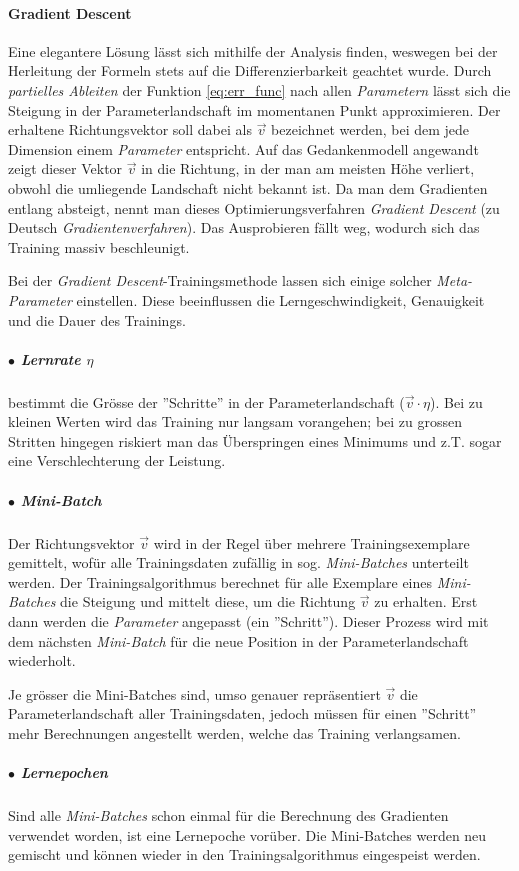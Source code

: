 \paragraph{Gradient Descent}\label{cha:theo:backprop:gd} Eine elegantere Lösung lässt sich mithilfe der Analysis finden, weswegen bei der Herleitung der Formeln stets auf die Differenzierbarkeit geachtet wurde. Durch \textit{partielles Ableiten} der Funktion \ref{eq:err_func} nach allen \textit{Parametern} lässt sich die Steigung in der Parameterlandschaft im momentanen Punkt approximieren. Der erhaltene Richtungsvektor soll dabei als $\vec{v}$ bezeichnet werden, bei dem jede Dimension einem \textit{Parameter} entspricht. Auf das Gedankenmodell angewandt zeigt dieser Vektor $\vec{v}$ in die Richtung, in der man am meisten Höhe verliert, obwohl die umliegende Landschaft nicht bekannt ist. Da man dem Gradienten entlang absteigt, nennt man dieses Optimierungsverfahren \textit{Gradient Descent} (zu Deutsch \textit{Gradientenverfahren}). Das Ausprobieren fällt weg, wodurch sich das Training massiv beschleunigt.

Bei der \textit{Gradient Descent}-Trainingsmethode lassen sich einige solcher \textit{Meta-Parameter} einstellen. Diese beeinflussen die Lerngeschwindigkeit, Genauigkeit und die Dauer des Trainings.

\subparagraph{$\bullet$ Lernrate $\eta$} bestimmt die Grösse der ''Schritte'' in der Parameterlandschaft ($\vec{v} \cdot \eta$). Bei zu kleinen Werten wird das Training nur langsam vorangehen; bei zu grossen Stritten hingegen riskiert man das Überspringen eines Minimums und z.T. sogar eine Verschlechterung der Leistung. 

\subparagraph{$\bullet$ Mini-Batch} Der Richtungsvektor $\vec{v}$ wird in der Regel über mehrere Trainingsexemplare gemittelt, wofür alle Trainingsdaten zufällig in sog. \textit{Mini-Batches} unterteilt werden. Der Trainingsalgorithmus berechnet für alle Exemplare eines \textit{Mini-Batches} die Steigung und mittelt diese, um die Richtung $\vec{v}$ zu erhalten. Erst dann werden die \textit{Parameter} angepasst (ein ''Schritt''). Dieser Prozess wird mit dem nächsten \textit{Mini-Batch} für die neue Position in der Parameterlandschaft wiederholt.

Je grösser die Mini-Batches sind, umso genauer repräsentiert $\vec{v}$ die Parameterlandschaft aller Trainingsdaten, jedoch müssen für einen ''Schritt'' mehr Berechnungen angestellt werden, welche das Training verlangsamen.


\subparagraph{$\bullet$ Lernepochen} Sind alle \textit{Mini-Batches} schon einmal für die Berechnung des Gradienten verwendet worden, ist eine Lernepoche vorüber. Die Mini-Batches werden neu gemischt und können wieder in den Trainingsalgorithmus eingespeist werden.

